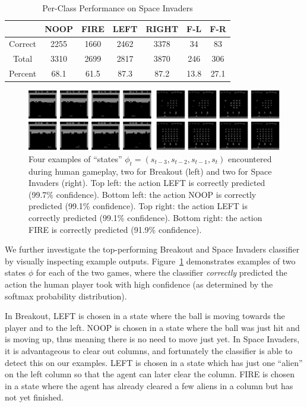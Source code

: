 \documentclass[letterpaper, 10pt, conference]{ieeeconf}
\begin{document}
\begin{table}[!t]
\renewcommand{\arraystretch}{1.3}
\caption{Per-Class Performance on Space Invaders}
\label{tab:spaceinv_perclass}
\centering
\begin{tabular}{c c c c c c c}
\hline
        & NOOP & FIRE & LEFT & RIGHT & F-L  & F-R  \\
\hline
Correct & 2255 & 1660 & 2462 & 3378  &  34  &   83 \\
Total   & 3310 & 2699 & 2817 & 3870  &  246 &  306 \\
Percent & 68.1 & 61.5 & 87.3 & 87.2  & 13.8 & 27.1 \\
\hline
\end{tabular}
\end{table}


\begin{figure}[t]
\centering
\includegraphics[width=1.00\textwidth]{figures/game_frame_examples.png}
\caption{\footnotesize
Four examples of ``states'' $\phi_t = (s_{t-3},s_{t-2},s_{t-1},s_t)$ encountered
during human gameplay, two for Breakout (left) and two for Space Invaders
(right). Top left: the action LEFT is correctly predicted (99.7\% confidence).
Bottom left: the action NOOP is correctly predicted (99.1\% confidence). Top
right: the action LEFT is correctly predicted (99.1\% confidence). Bottom right:
the action FIRE is correctly predicted (91.9\% confidence).
}
\label{fig:example_game_frames}
\end{figure}

We further investigate the top-performing Breakout and Space Invaders classifier
by visually inspecting example outputs. Figure~\ref{fig:example_game_frames}
demonstrates examples of two states $\phi$ for each of the two games, where the
classifier \emph{correctly} predicted the action the human player took with high
confidence (as determined by the softmax probability distribution).

In Breakout, LEFT is chosen in a state where the ball is moving towards the
player and to the left. NOOP is chosen in a state where the ball was just hit
and is moving up, thus meaning there is no need to move just yet. In Space
Invaders, it is advantageous to clear out columns, and fortunately the
classifier is able to detect this on our examples.  LEFT is chosen in a state
which has just one ``alien'' on the left column so that the agent can later
clear the column. FIRE is chosen in a state where the agent has already cleared
a few aliens in a column but has not yet finished.
\end{document}
